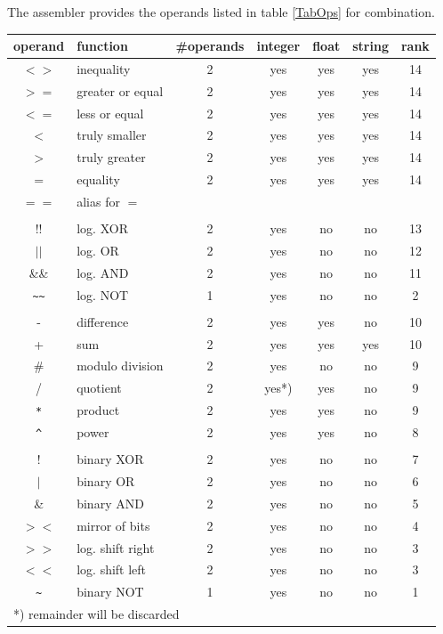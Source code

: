 \documentclass[12pt,twoside]{report}
\begin{document}
The assembler provides the operands listed in table \ref{TabOps} for
combination.
\begin{table*}[htbp]
\begin{center}\begin{tabular}{|c|l|c|c|c|c|c|}
\hline
operand & function            & \#operands & integer & float & string & rank \\
\hline
\hline
$<>$        & inequality       & 2 & yes   & yes & yes & 14 \\
$>=$        & greater or equal & 2 & yes   & yes & yes & 14 \\
$<=$        & less or equal    & 2 & yes   & yes & yes & 14 \\
$<$         & truly smaller    & 2 & yes   & yes & yes & 14 \\
$>$         & truly greater    & 2 & yes   & yes & yes & 14 \\
$=$         & equality         & 2 & yes   & yes & yes & 14 \\
$==$        & alias for $=$    &   &       &     &     &    \\
            & & & & & &  \\
$!!$        & log. XOR         & 2 & yes   & no  & no  & 13 \\
$||$        & log. OR          & 2 & yes   & no  & no  & 12 \\
\&\&        & log. AND         & 2 & yes   & no  & no  & 11 \\
\verb! ~~ ! & log. NOT         & 1 & yes   & no  & no  & 2 \\
            & & & & & &  \\
-           & difference       & 2 & yes   & yes & no  & 10 \\
+           & sum              & 2 & yes   & yes & yes & 10 \\
\#          & modulo division  & 2 & yes   & no  & no  & 9 \\
/           & quotient         & 2 & yes*) & yes & no  & 9 \\
\verb! * !  & product          & 2 & yes   & yes & no  & 9 \\
\verb! ^ !  & power            & 2 & yes   & yes & no  & 8 \\
            & & & & & &  \\
$!$         & binary XOR       & 2 & yes   & no  & no  & 7 \\
$|$         & binary OR        & 2 & yes   & no  & no  & 6 \\
\&          & binary AND       & 2 & yes   & no  & no  & 5 \\
$><$        & mirror of bits   & 2 & yes   & no  & no  & 4 \\
$>>$        & log. shift right & 2 & yes   & no  & no  & 3 \\
$<<$        & log. shift left  & 2 & yes   & no  & no  & 3 \\
\verb! ~ !  & binary NOT       & 1 & yes   & no  & no  & 1 \\
\hline
\multicolumn{7}{|l|}{*) remainder will be discarded} \\
\hline
\end{tabular}\end{center}
\caption{Operators Predefined by AS\label{TabOps}}
\end{table*}
\end{document}
